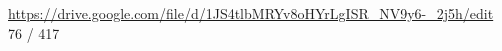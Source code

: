 \vspace{4cm}
\url{https://drive.google.com/file/d/1JS4tlbMRYv8oHYrLgISR_NV9y6-_2j5h/edit}\\
76 / 417


















































































































